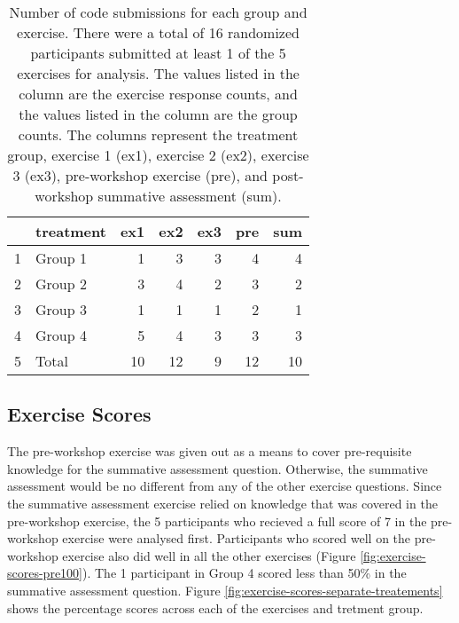 \documentclass[040-assessment.tex]{subfiles}
\begin{document}
    \begin{table}[ht]
        \centering
        \caption[Number of responses by group and exercise]
        {Number of code submissions for each group and exercise.
         There were a total of 16 randomized participants submitted at least 1 of the 5 exercises for analysis.
         The values listed in the  column are the exercise response counts,
         and the values listed in the  column are the group counts.
         The columns represent the
         treatment group,
         exercise 1 (ex1), exercise 2 (ex2), exercise 3 (ex3),
         pre-workshop exercise (pre), and
         post-workshop summative assessment (sum).
        }
        \begin{tabular}{rlrrrrr}
            \hline
           & treatment & ex1 & ex2 & ex3 & pre & sum \\
            \hline
            1 & Group 1 &   1 &   3 &   3 &   4 &   4 \\
            2 & Group 2 &   3 &   4 &   2 &   3 &   2 \\
            3 & Group 3 &   1 &   1 &   1 &   2 &   1 \\
            4 & Group 4 &   5 &   4 &   3 &   3 &   3 \\
            5 & Total &  10 &  12 &   9 &  12 &  10 \\
             \hline
          \end{tabular}
          \label{tab:exercise-treatment-response-counts}
    \end{table}

\subsection{Exercise Scores}

    The pre-workshop exercise was given out as a means to cover pre-requisite knowledge for the
    summative assessment question.
    Otherwise, the summative assessment would be no different from any of the other exercise
    questions.
    Since the summative assessment exercise relied on knowledge that was covered in the
    pre-workshop exercise,
    the 5 participants who recieved a full score of 7 in the pre-workshop exercise were analysed first.
    Participants who scored well on the pre-workshop exercise also did well in all the other exercises
    (Figure \ref{fig:exercise-scores-pre100}).
    The 1 participant in Group 4 scored less than 50\% in the summative assessment question.
    Figure \ref{fig:exercise-scores-separate-treatements} shows the percentage scores across each
    of the exercises and tretment group.
\end{document}
